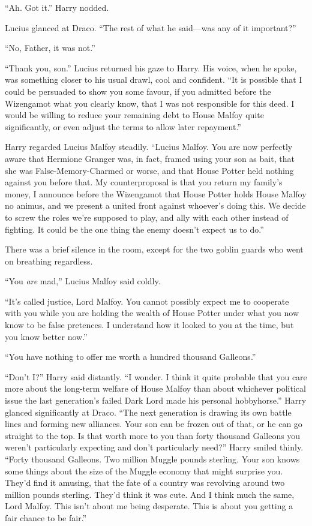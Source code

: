 “Ah. Got it.” Harry nodded.

Lucius glanced at Draco. “The rest of what he said—was any of it important?”

“No, Father, it was not.”

“Thank you, son.” Lucius returned his gaze to Harry. His voice, when he spoke, was something closer to his usual drawl, cool and confident. “It is possible that I could be persuaded to show you some favour, if you admitted before the Wizengamot what you clearly know, that I was not responsible for this deed. I would be willing to reduce your remaining debt to House Malfoy quite significantly, or even adjust the terms to allow later repayment.”

Harry regarded Lucius Malfoy steadily. “Lucius Malfoy. You are now perfectly aware that Hermione Granger was, in fact, framed using your son as bait, that she was False-Memory-Charmed or worse, and that House Potter held nothing against you before that. My counterproposal is that you return my family’s money, I announce before the Wizengamot that House Potter holds House Malfoy no animus, and we present a united front against whoever’s doing this. We decide to screw the roles we’re supposed to play, and ally with each other instead of fighting. It could be the one thing the enemy doesn’t expect us to do.”

There was a brief silence in the room, except for the two goblin guards who went on breathing regardless.

“You \emph{are} mad,” Lucius Malfoy said coldly.

“It’s called justice, Lord Malfoy. You cannot possibly expect me to cooperate with you while you are holding the wealth of House Potter under what you now know to be false pretences. I understand how it looked to you at the time, but you know better now.”

“You have nothing to offer me worth a hundred thousand Galleons.”

“Don’t I?” Harry said distantly. “I wonder. I think it quite probable that you care more about the long-term welfare of House Malfoy than about whichever political issue the last generation’s failed Dark Lord made his personal hobbyhorse.” Harry glanced significantly at Draco. “The next generation is drawing its own battle lines and forming new alliances. Your son can be frozen out of that, or he can go straight to the top. Is that worth more to you than forty thousand Galleons you weren’t particularly expecting and don’t particularly need?” Harry smiled thinly. “Forty thousand Galleons. Two million Muggle pounds sterling. Your son knows some things about the size of the Muggle economy that might surprise you. They’d find it amusing, that the fate of a country was revolving around two million pounds sterling. They’d think it was cute. And I think much the same, Lord Malfoy. This isn’t about me being desperate. This is about you getting a fair chance to be fair.”

